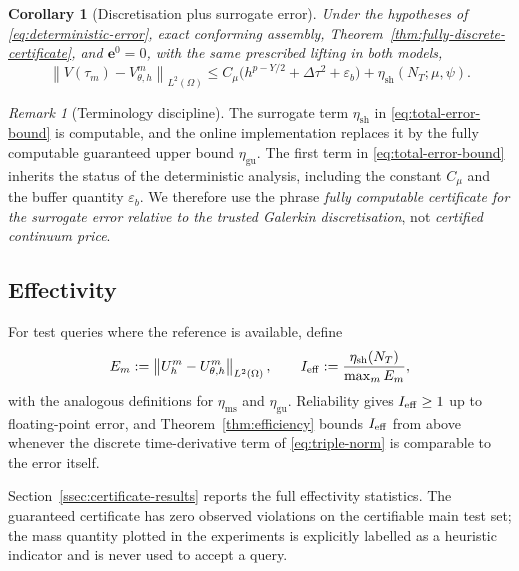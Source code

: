 \documentclass[11pt]{amsart}
\newtheorem{corollary}[theorem]{Corollary}
\theoremstyle{remark}
\newtheorem{remark}[theorem]{Remark}
\newcommand{\norm}[1]{\left\lVert #1\right\rVert}
\newcommand{\dt}{\Delta\tau}
\newcommand{\etaSharp}{\eta_{\mathrm{sh}}}
\newcommand{\etaMass}{\eta_{\mathrm{ms}}}
\newcommand{\etaGuar}{\eta_{\mathrm{gu}}}
\newcommand{\ee}{\mathbf e}
\begin{document}
\begin{corollary}[Discretisation plus surrogate error]
\label{cor:total-error}
Under the hypotheses of \eqref{eq:deterministic-error}, exact conforming
assembly, Theorem~\ref{thm:fully-discrete-certificate}, and $\ee^0=0$,
with the same prescribed lifting
in both models,
\begin{equation}
 \norm{V(\tau_m)-V_{\theta,h}^m}_{L^2(\Omega)}
 \le C_\mu\bigl(h^{p-Y/2}+\dt^2+\varepsilon_b\bigr)
   +\etaSharp(N_T;\mu,\psi).
 \label{eq:total-error-bound}
\end{equation}
\end{corollary}

\begin{remark}[Terminology discipline]
\label{rem:terminology}
The surrogate term $\etaSharp$ in \eqref{eq:total-error-bound} is computable,
and the online implementation replaces it by the fully computable guaranteed
upper bound $\etaGuar$.  The first term in \eqref{eq:total-error-bound}
inherits the status of the deterministic analysis, including the constant
$C_\mu$ and the buffer quantity $\varepsilon_b$.  We therefore use the phrase
\emph{fully computable certificate for the surrogate error relative to the
trusted Galerkin discretisation}, not \emph{certified continuum price}.
\end{remark}

\subsection{Effectivity}
\label{ssec:effectivity}

For test queries where the reference is available, define
\begin{equation}
  E_m:=\norm{U_h^m-U_{\theta,h}^m}_{L^2(\Omega)},
  \qquad
  I_{\rm eff}:=\frac{\etaSharp(N_T)}{\max_mE_m},
  \label{eq:effectivity}
\end{equation}
with the analogous definitions for $\etaMass$ and $\etaGuar$.  Reliability
gives $I_{\rm eff}\ge1$ up to floating-point error, and
Theorem~\ref{thm:efficiency} bounds $I_{\rm eff}$ from above whenever the
discrete time-derivative term of \eqref{eq:triple-norm} is comparable to the
error itself.

Section~\ref{ssec:certificate-results} reports the full effectivity
statistics.  The guaranteed certificate has zero observed violations on the
certifiable main test set; the mass quantity plotted in the experiments is
explicitly labelled as a heuristic indicator and is never used to accept a
query.
\end{document}
